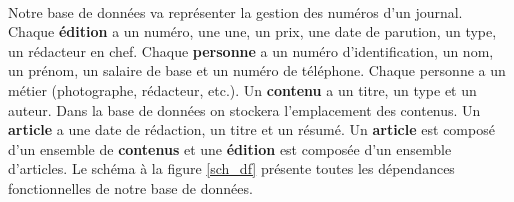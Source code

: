 \paragraph{}{
    Notre base de données va représenter la gestion des numéros d'un journal. Chaque \textbf{édition} a un numéro, une une, un prix, une date de parution, un type, un rédacteur en chef. Chaque \textbf{personne} a un numéro d'identification, un nom, un prénom, un salaire de base et un numéro de téléphone. Chaque personne a un métier (photographe, rédacteur, etc.). Un \textbf{contenu} a un titre, un type et un auteur. Dans la base de données on stockera l'emplacement des contenus. Un \textbf{article} a une date de rédaction, un titre et un résumé. Un \textbf{article} est composé d'un ensemble de \textbf{contenus} et une \textbf{édition} est composée d'un ensemble d'articles. \newline
    Le schéma à la figure \ref{sch_df} présente toutes les dépendances fonctionnelles de notre base de données.
}